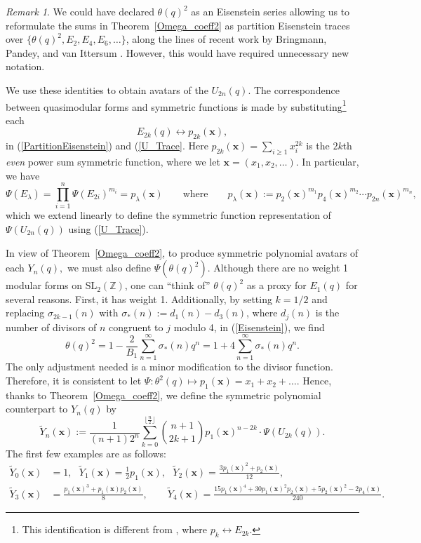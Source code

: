 \documentclass[11pt]{amsart}
\theoremstyle{definition}
\theoremstyle{remark}
\newtheorem*{remark}{Remark}
\numberwithin{equation}{section}
\newcommand{\SL}{\mathrm{SL}}
\newcommand{\Z}{\mathbb Z}
\begin{document}
\begin{remark} We could have declared $\theta(q)^2$ as an Eisenstein series allowing us to reformulate the sums in Theorem~\ref{Omega_coeff2} as partition Eisenstein traces over $\{\theta(q)^2, E_2, E_4, E_6,\dots\}$, along the lines of recent work by Bringmann, Pandey, and van Ittersum \cite{BPvI}. However, this would have required unnecessary new notation.
\end{remark}



We use these identities to obtain avatars of the $U_{2n}(q).$ The correspondence between quasimodular forms and symmetric functions is made by substituting\footnote{This identification is different from \cite{AGO}, where $p_k\longleftrightarrow E_{2k}$.} each
$$E_{2k}(q) \longleftrightarrow p_{2k}(\pmb{x}),$$
 in (\ref{PartitionEisenstein}) and (\ref{U_Trace}.  Here $p_{2k}(\pmb{x})=\sum_{i\geq 1} x_i^{2k}$ is the $2k$th \emph{even} power sum symmetric function, where we let $\pmb{x}=(x_1, x_2,\dots).$ In particular, we have
\begin{equation}\label{PsiProduct}
\Psi(E_{\lambda})=\prod_{i=1}^n \Psi(E_{2i})^{m_i}=p_{\lambda}(\pmb{x}) \qquad \text{where} \qquad
p_{\lambda}(\pmb{x}):=p_2(\pmb{x})^{m_1} p_4(\pmb{x})^{m_2}\cdots p_{2n}(\pmb{x})^{m_n},
\end{equation}
which we extend linearly to define the symmetric function representation of $\Psi(U_{2n}(q))$ using (\ref{U_Trace}).

In view of Theorem~\ref{Omega_coeff2}, to produce symmetric polynomial avatars of each $Y_n(q),$ we must also define $\Psi(\theta(q)^2)$. Although there are no weight 1 modular forms on $\SL_2(\Z)$, one can ``think of''  $\theta(q)^2$ as a proxy for $E_1(q)$ for several reasons. First, it has weight 1. Additionally, by setting $k=1/2$ and replacing 
$\sigma_{2k-1}(n)$ with $\sigma_* (n):=d_1(n)-d_3(n)$, where $d_j(n)$ is the number of divisors of $n$ congruent to $j$ modulo 4, in (\ref{Eisenstein}), we find
$$
\theta(q)^2=1-\frac{2}{B_1}\sum_{n=1}^{\infty} \sigma_*(n)q^n=1+4\sum_{n=1}^{\infty}\sigma_*(n)q^n.
$$
The only adjustment needed is a minor modification to the divisor function.
Therefore, it is consistent to let $\Psi: \theta^2(q)\mapsto p_1(\pmb{x})=x_1+x_2+\dots$. 
Hence, thanks to Theorem~\ref{Omega_coeff2}, we define the symmetric polynomial counterpart to
$Y_n(q)$ by
\begin{equation} \label{Yn_tilde}
\widetilde{Y}_n(\pmb{x})
:= \frac1{(n+1)2^n} \sum_{k=0}^{\lfloor\frac{n}2\rfloor} \binom{n+1}{2k+1} p_1(\pmb{x})^{n-2k}\cdot \Psi(U_{2k}(q)).
\end{equation}
The first few examples are as follows:
\begin{align*}
\widetilde{{Y}}_0(\pmb{x})&=1, \ \ \ 
\widetilde{Y}_1(\pmb{x}) = \frac12p_1(\pmb{x}), \ \ \ 
\widetilde{{Y}}_2(\pmb{x}) = \frac{3p_1(\pmb{x})^2+p_2(\pmb{x})}{12}, \\
\widetilde{{Y}}_3(\pmb{x}) &= \frac{p_1(\pmb{x})^3+p_1(\pmb{x})p_2(\pmb{x})}8, \qquad
\widetilde{{Y}}_4(\pmb{x})= \frac{15p_1(\pmb{x})^4+30p_1(\pmb{x})^2p_2(\pmb{x})+5p_2(\pmb{x})^2-2p_4(\pmb{x})}{240}.
\end{align*}
\end{document}
